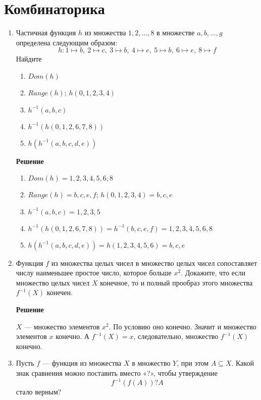 \documentclass[12pt]{article}
\newcommand{\RomanNumeralCaps}[1]
{\MakeUppercase{\romannumeral #1}}
\begin{document}
	\section{Комбинаторика \RomanNumeralCaps{2}}
	\begin{enumerate}[label={\textbf{\arabic{section}.\arabic*}}]
		\item Частичная функция $h$ из множества ${1,2,\dots,8}$ в множестве ${a,b,\dots,g}$ определена следующим образом:
		$$
		h:1\mapsto b,~2\mapsto c,~3\mapsto b,~4\mapsto e,~5\mapsto b,~6\mapsto e,~8\mapsto f
		$$
		Найдите 
		\begin{enumerate}[label=\textbf{\alph*)}]
			\item $Dom(h)$
			\item $Range(h)$; $h({0,1,2,3,4})$
			\item $h^{-1}({a,b,c})$
			\item $h^{-1}(h({0,1,2,6,7,8}))$
			\item $h(h^{-1}({a,b,c,d,e}))$
		\end{enumerate}
	
		\textbf{Решение}
		\begin{enumerate}[label=\textbf{\alph*)}]
			\item $Dom(h) = {1,2,3,4,5,6,8}$
			\item $Range(h) = {b,c,e,f}$; $h({0,1,2,3,4}) = {b,c,e}$
			\item $h^{-1}({a,b,c}) = {1,2,3,5}$
			\item $h^{-1}(h({0,1,2,6,7,8})) = h^{-1}(b,c,e,f) = {1,2,3,4,5,6,8}$
			\item $h(h^{-1}({a,b,c,d,e})) = h({1,2,3,4,5,6}) = {b,c,e}$
		\end{enumerate}
	
		\item Функция $f$ из множества целых чисел в множество целых чисел сопоставляет числу наименьшее простое число, которое больше $x^2$. Докажите, что если множество целых чисел $X$ конечное, то и полный прообраз этого множества$ f^{-1}(X)$ конечен.
		
		\textbf{Решение}
		
		$X$ --- множество элементов $x^2$. По условию оно конечно. Значит и множество элементов $x$ конечно. А $f^{-1}(X) = x$, следовательно, множество $f^{-1}(X)$ конечно.
		
		\item Пусть $f$ --- функция из множества $X$ в множество $Y$, при этом $A\subseteq X$. Какой знак сравнения можно поставить вместо «?», чтобы утверждение
		$$
		f^{-1}(f(A))?A
		$$
		стало верным?
		

\end{enumerate}
\end{document}
